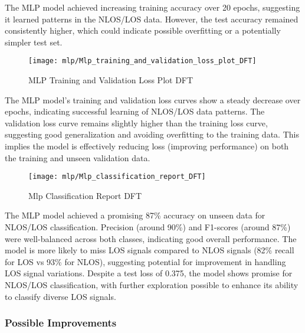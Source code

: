 The MLP model achieved increasing training accuracy over 20 epochs, suggesting it learned patterns in the NLOS/LOS data. However, the test accuracy remained consistently higher, which could indicate possible overfitting or a potentially simpler test set.

\begin{figure}[H] 
	\centering
	\texttt{[image: mlp/Mlp\_training\_and\_validation\_loss\_plot\_DFT]}
	\caption{MLP Training and Validation Loss Plot DFT}\label{fig:Mlp_training_and_validation_loss_plot_DFT}
\end{figure}

The MLP model's training and validation loss curves show a steady decrease over epochs, indicating successful learning of NLOS/LOS data patterns. The validation loss curve remains slightly higher than the training loss curve, suggesting good generalization and avoiding overfitting to the training data. This implies the model is effectively reducing loss (improving performance) on both the training and unseen validation data.

\begin{figure}[H] 
	\centering
	\texttt{[image: mlp/Mlp\_classification\_report\_DFT]}
	\caption{Mlp Classification Report DFT}\label{fig:Mlp_classification_report_DFT}
\end{figure}

The MLP model achieved a promising 87\% accuracy on unseen data for NLOS/LOS classification. Precision (around 90\%) and F1-scores (around 87\%) were well-balanced across both classes, indicating good overall performance. The model is more likely to miss LOS signals compared to NLOS signals (82\% recall for LOS vs 93\% for NLOS), suggesting potential for improvement in handling LOS signal variations. Despite a test loss of 0.375, the model shows promise for NLOS/LOS classification, with further exploration possible to enhance its ability to classify diverse LOS signals.

\subsubsection{Possible Improvements}

